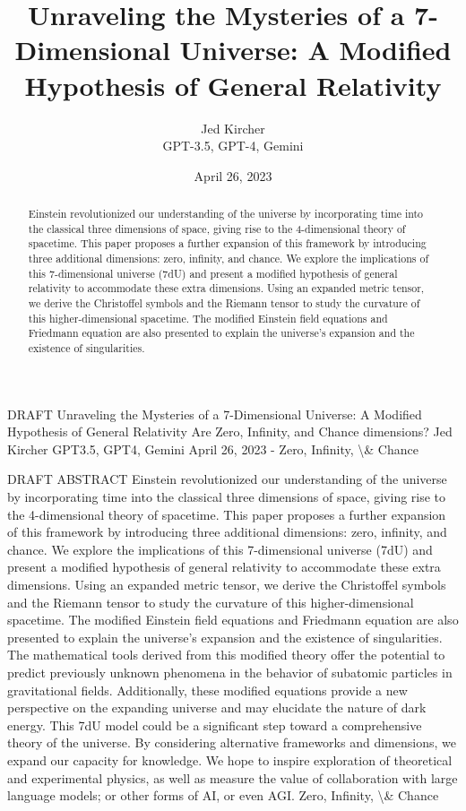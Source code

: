 \documentclass[12pt]{article}
\title{Unraveling the Mysteries of a 7-Dimensional Universe: A Modified Hypothesis of General Relativity}
\author{Jed Kircher \\ GPT-3.5, GPT-4, Gemini}
\date{April 26, 2023}
\begin{document}
\maketitle

\begin{abstract}
Einstein revolutionized our understanding of the universe by incorporating time into the classical three dimensions of space, giving rise to the 4-dimensional theory of spacetime.
This paper proposes a further expansion of this framework by introducing three additional dimensions: zero, infinity, and chance. We explore the implications of this 7-dimensional universe (7dU) and present a modified hypothesis of general relativity to accommodate these extra dimensions.
Using an expanded metric tensor, we derive the Christoffel symbols and the Riemann tensor to study the curvature of this higher-dimensional spacetime. The modified Einstein field equations and Friedmann equation are also presented to explain the universe's expansion and the existence of singularities.
\end{abstract}

DRAFT
Unraveling the Mysteries of a
7-Dimensional Universe: A Modiﬁed
Hypothesis of General Relativity
Are Zero, Inﬁnity, and Chance dimensions?
Jed Kircher
GPT3.5, GPT4, Gemini
April 26, 2023 -
Zero, Infinity, \textbackslash{}& Chance

DRAFT
ABSTRACT
Einstein revolutionized our understanding of the universe by incorporating time into the
classical three dimensions of space, giving rise to the 4-dimensional theory of
spacetime.
This paper proposes a further expansion of this framework by introducing three
additional dimensions: zero, inﬁnity, and chance. We explore the implications of this
7-dimensional universe (7dU) and present a modiﬁed hypothesis of general relativity to
accommodate these extra dimensions.
Using an expanded metric tensor, we derive the Christoﬀel symbols and the Riemann
tensor to study the curvature of this higher-dimensional spacetime. The modiﬁed
Einstein ﬁeld equations and Friedmann equation are also presented to explain the
universe's expansion and the existence of singularities.
The mathematical tools derived from this modiﬁed theory oﬀer the potential to predict
previously unknown phenomena in the behavior of subatomic particles in gravitational
ﬁelds. Additionally, these modiﬁed equations provide a new perspective on the
expanding universe and may elucidate the nature of dark energy. This 7dU model could
be a signiﬁcant step toward a comprehensive theory of the universe.
By considering alternative frameworks and dimensions, we expand our capacity for
knowledge. We hope to inspire exploration of theoretical and experimental physics, as
well as measure the value of collaboration with large language models; or other forms
of AI, or even AGI.
Zero, Infinity, \textbackslash{}& Chance
\end{document}
